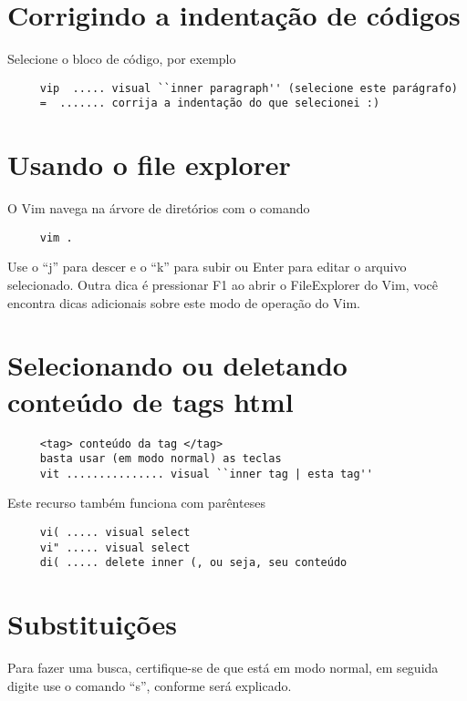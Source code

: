 \section{Corrigindo a indentação de códigos}
\label{Corrigindo a indentação de códigos}
Selecione o bloco de código, por exemplo

\begin{verbatim}
     vip  ..... visual ``inner paragraph'' (selecione este parágrafo)
     =  ....... corrija a indentação do que selecionei :)
\end{verbatim}

\section{Usando o file explorer}
\label{Usando o file explorer}
O Vim navega na árvore de diretórios com o comando

\begin{verbatim}
     vim .
\end{verbatim}

Use o ``j'' para descer e o ``k'' para subir ou Enter para editar o
arquivo selecionado. Outra dica é pressionar F1 ao abrir o
FileExplorer do Vim, você encontra dicas adicionais sobre este modo de
operação do Vim.

\section{Selecionando ou deletando conteúdo de tags html}
\label{Selecionando ou deletando conteúdo de tags html}

\begin{verbatim}
     <tag> conteúdo da tag </tag>
     basta usar (em modo normal) as teclas
     vit ............... visual ``inner tag | esta tag''
\end{verbatim}

Este recurso também funciona com parênteses

\begin{verbatim}
     vi( ..... visual select
     vi" ..... visual select
     di( ..... delete inner (, ou seja, seu conteúdo
\end{verbatim}


\section{Substituições }
\label{Substituições }

Para fazer uma busca, certifique-se de que está em modo normal, em
seguida digite use o comando ``s'', conforme será explicado.

